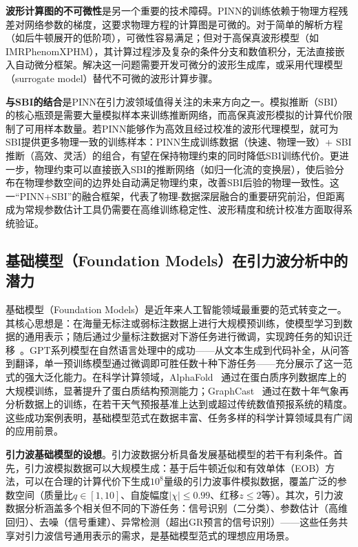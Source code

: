 \textbf{波形计算图的不可微性}是另一个重要的技术障碍。PINN的训练依赖于物理方程残差对网络参数的梯度，这要求物理方程的计算图是可微的。对于简单的解析方程（如后牛顿展开的低阶项），可微性容易满足；但对于高保真波形模型（如IMRPhenomXPHM），其计算过程涉及复杂的条件分支和数值积分，无法直接嵌入自动微分框架。解决这一问题需要开发可微分的波形生成库，或采用代理模型（surrogate model）替代不可微的波形计算步骤。

\textbf{与SBI的结合}是PINN在引力波领域值得关注的未来方向之一。模拟推断（SBI）的核心瓶颈是需要大量模拟样本来训练推断网络，而高保真波形模拟的计算代价限制了可用样本数量。若PINN能够作为高效且经过校准的波形代理模型，就可为SBI提供更多物理一致的训练样本：PINN生成训练数据（快速、物理一致）+ SBI推断（高效、灵活）的组合，有望在保持物理约束的同时降低SBI训练代价。更进一步，物理约束可以直接嵌入SBI的推断网络（如归一化流的变换层），使后验分布在物理参数空间的边界处自动满足物理约束，改善SBI后验的物理一致性。这一“PINN+SBI”的融合框架，代表了物理-数据深层融合的重要研究前沿，但距离成为常规参数估计工具仍需要在高维训练稳定性、波形精度和统计校准方面取得系统验证。

\subsection{基础模型（Foundation Models）在引力波分析中的潜力}

基础模型（Foundation Models）是近年来人工智能领域最重要的范式转变之一。其核心思想是：在海量无标注或弱标注数据上进行大规模预训练，使模型学习到数据的通用表示；随后通过少量标注数据对下游任务进行微调，实现跨任务的知识迁移~\cite{bommasani2021foundation}。GPT系列模型在自然语言处理中的成功——从文本生成到代码补全，从问答到翻译，单一预训练模型通过微调即可胜任数十种下游任务——充分展示了这一范式的强大泛化能力。在科学计算领域，AlphaFold~\cite{jumper2021alphafold} 通过在蛋白质序列数据库上的大规模训练，显著提升了蛋白质结构预测能力；GraphCast~\cite{lam2023graphcast} 通过在数十年气象再分析数据上的训练，在若干天气预报基准上达到或超过传统数值预报系统的精度。这些成功案例表明，基础模型范式在数据丰富、任务多样的科学计算领域具有广阔的应用前景。

\textbf{引力波基础模型的设想}。引力波数据分析具备发展基础模型的若干有利条件。首先，引力波模拟数据可以大规模生成：基于后牛顿近似和有效单体（EOB）方法，可以在合理的计算代价下生成$10^8$量级的引力波事件模拟数据，覆盖广泛的参数空间（质量比$q \in [1, 10]$、自旋幅度$|\chi| \leq 0.99$、红移$z \leq 2$等）。其次，引力波数据分析涵盖多个相关但不同的下游任务：信号识别（二分类）、参数估计（高维回归）、去噪（信号重建）、异常检测（超出GR预言的信号识别）——这些任务共享对引力波信号通用表示的需求，是基础模型范式的理想应用场景。

